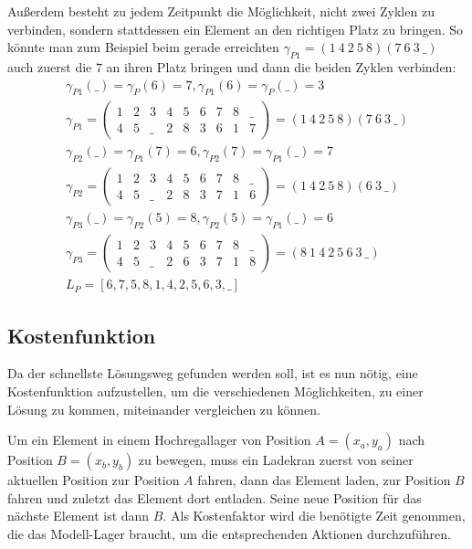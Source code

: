 \documentclass{fh-ium-bama}
\begin{document}
Außerdem besteht zu jedem Zeitpunkt die Möglichkeit, nicht zwei Zyklen zu verbinden, sondern stattdessen ein Element an den richtigen Platz zu bringen. So könnte man zum Beispiel beim gerade erreichten $\gamma_{P1} = (1~4~2~5~8)(7~6~3~\_)$ auch zuerst die $7$ an ihren Platz bringen und dann die beiden Zyklen verbinden:
\begin{gather*}
\gamma_{P1}(\_) = \gamma_P(6) = 7, \gamma_{P1}(6) = \gamma_P(\_) = 3\\
\gamma_{P1} = \begin{pmatrix}
	1 & 2 & 3 & 4 & 5 & 6 & 7 & 8 & \_ \\
	4 & 5 & \_ & 2 & 8 & 3 & 6 & 1 & 7
\end{pmatrix} =
(1 ~ 4 ~ 2 ~ 5 ~ 8)(7 ~ 6 ~ 3 ~ \_)\\
\gamma_{P2}(\_) = \gamma_{P1}(7) = 6, \gamma_{P2}(7) = \gamma_{P1}(\_) = 7\\
\gamma_{P2} = \begin{pmatrix}
	1 & 2 & 3 & 4 & 5 & 6 & 7 & 8 & \_ \\
	4 & 5 & \_ & 2 & 8 & 3 & 7 & 1 & 6
\end{pmatrix} =
(1 ~ 4 ~ 2 ~ 5 ~ 8)(6 ~ 3 ~ \_)\\
\gamma_{P3}(\_) = \gamma_{P2}(5) = 8, \gamma_{P2}(5) = \gamma_{P1}(\_) = 6\\
\gamma_{P3} = \begin{pmatrix}
	1 & 2 & 3 & 4 & 5 & 6 & 7 & 8 & \_ \\
	4 & 5 & \_ & 2 & 6 & 3 & 7 & 1 & 8
\end{pmatrix} =
(8 ~ 1 ~ 4 ~ 2 ~ 5 ~ 6 ~ 3 ~ \_)\\
L_P = [6, 7, 5, 8, 1, 4, 2, 5, 6, 3, \_]
\end{gather*}

\subsection{Kostenfunktion}
Da der schnellste Lösungsweg gefunden werden soll, ist es nun nötig, eine Kostenfunktion aufzustellen, um die verschiedenen Möglichkeiten, zu einer Lösung zu kommen, miteinander vergleichen zu können.

Um ein Element in einem Hochregallager von Position $A=(x_a,y_a)$ nach Position $B=(x_b,y_b)$ zu bewegen, muss ein Ladekran zuerst von seiner aktuellen Position zur Position $A$ fahren, dann das Element laden, zur Position $B$ fahren und zuletzt das Element dort entladen. Seine neue Position für das nächste Element ist dann $B$. Als Kostenfaktor wird die benötigte Zeit genommen, die das Modell-Lager braucht, um die entsprechenden Aktionen durchzuführen.
\end{document}
